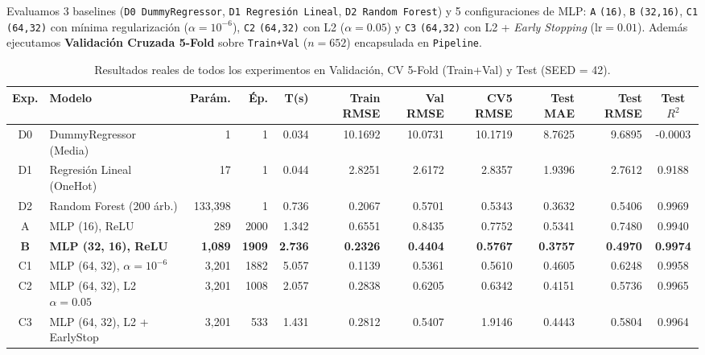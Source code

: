 \documentclass[11pt,a4paper]{article}
\begin{document}
\begin{description}[leftmargin=0.8cm, style=nextline, itemsep=6pt]
    \item[Etapas 08 a 14 — Baselines, diseño MLP, experimentos A--D, curvas, CV y selección:]
    Evaluamos 3 baselines (\texttt{D0 DummyRegressor}, \texttt{D1 Regresión Lineal}, \texttt{D2 Random Forest}) y 5 configuraciones de MLP: \texttt{A} \texttt{(16)}, \texttt{B} \texttt{(32,16)}, \texttt{C1} \texttt{(64,32)} con mínima regularización ($\alpha = 10^{-6}$), \texttt{C2} \texttt{(64,32)} con L2 ($\alpha = 0.05$) y \texttt{C3} \texttt{(64,32)} con L2 + \textit{Early Stopping} ($\text{lr}=0.01$). Además ejecutamos \textbf{Validación Cruzada 5-Fold} sobre \texttt{Train+Val} ($n=652$) encapsulada en \texttt{Pipeline}.
\end{description}

\begin{table}[H]
\centering
\caption{Resultados reales de todos los experimentos en Validación, CV 5-Fold (Train+Val) y Test (SEED = 42).}
\label{tab:resultados}
\scriptsize
\begin{tabular}{clrrrrrrrrc}
\toprule
\textbf{Exp.} & \textbf{Modelo} & \textbf{Parám.} & \textbf{Ép.} & \textbf{T(s)} & \textbf{Train RMSE} & \textbf{Val RMSE} & \textbf{CV5 RMSE} & \textbf{Test MAE} & \textbf{Test RMSE} & \textbf{Test $R^2$} \\
\midrule
D0 & DummyRegressor (Media) & 1 & 1 & 0.034 & 10.1692 & 10.0731 & 10.1719 & 8.7625 & 9.6895 & -0.0003 \\
D1 & Regresión Lineal (OneHot) & 17 & 1 & 0.044 & 2.8251 & 2.6172 & 2.8357 & 1.9396 & 2.7612 & 0.9188 \\
D2 & Random Forest (200 árb.) & 133,398 & 1 & 0.736 & 0.2067 & 0.5701 & 0.5343 & 0.3632 & 0.5406 & 0.9969 \\
\midrule
A & MLP (16), ReLU & 289 & 2000 & 1.342 & 0.6551 & 0.8435 & 0.7752 & 0.5341 & 0.7480 & 0.9940 \\
\textbf{B} & \textbf{MLP (32, 16), ReLU} & \textbf{1,089} & \textbf{1909} & \textbf{2.736} & \textbf{0.2326} & \textbf{0.4404} & \textbf{0.5767} & \textbf{0.3757} & \textbf{0.4970} & \textbf{0.9974} \\
C1 & MLP (64, 32), $\alpha=10^{-6}$ & 3,201 & 1882 & 5.057 & 0.1139 & 0.5361 & 0.5610 & 0.4605 & 0.6248 & 0.9958 \\
C2 & MLP (64, 32), L2 $\alpha=0.05$ & 3,201 & 1008 & 2.057 & 0.2838 & 0.6205 & 0.6342 & 0.4151 & 0.5736 & 0.9965 \\
C3 & MLP (64, 32), L2 + EarlyStop & 3,201 & 533 & 1.431 & 0.2812 & 0.5407 & 1.9146 & 0.4443 & 0.5804 & 0.9964 \\
\bottomrule
\end{tabular}
\end{table}
\end{document}
